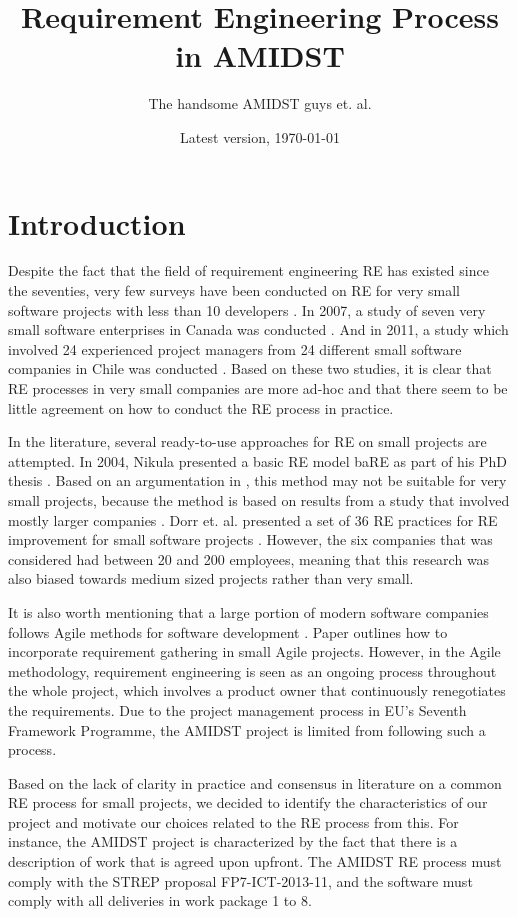 \documentclass[11pt, oneside]{article}   	%
\title{Requirement Engineering Process in AMIDST}
\author{The handsome AMIDST guys et. al.}
\date{Latest version, \today}							%
\begin{document}
\maketitle
%
%
\section{Introduction}

Despite the fact that the field of requirement engineering RE has existed since the seventies, very few surveys have been conducted on RE for very small software projects with less than 10 developers \cite{Qui10}. In 2007, a study of seven very small software enterprises in Canada was conducted \cite{Ara07}.
And in 2011, a study which involved 24 experienced project managers from 24 different small software companies in Chile was conducted \cite{Qui10}.  Based on these two studies, it is clear that RE processes in very small companies are more ad-hoc and that there seem to be little agreement on how to conduct the RE process in practice.

In the literature, several ready-to-use approaches for RE on small projects are attempted.  In 2004, Nikula presented a basic RE model baRE as part of his PhD thesis \cite{Nik04}.  Based on an argumentation in \cite{Qui10}, this method may not be suitable for very small projects, because the method is based on results from a study that involved mostly larger companies \cite{Nik00}.   Dorr et. al. presented a set of 36 RE practices for RE improvement for small software projects \cite{Dor08}.  However, the six companies that was considered had between 20 and 200 employees, meaning that this research was also biased towards medium sized projects rather than very small. 

It is also worth mentioning that a large portion of modern software companies follows Agile methods for software development \cite{Din10}.  Paper \cite{Kav11} outlines how to incorporate requirement gathering in small Agile projects.  However, in the Agile methodology, requirement engineering is seen as an ongoing process throughout the whole project, which involves a product owner that continuously renegotiates the requirements.  Due to the project management process in EU's Seventh Framework Programme, the AMIDST project is limited from following such a process. 

Based on the lack of clarity in practice and consensus in literature on a common RE process for small projects, we decided to identify the characteristics of our project and motivate our choices related to the RE process from this.  For instance, the AMIDST project is characterized by the fact that there is a description of work that is agreed upon upfront.  The 
AMIDST RE process must comply with the STREP proposal FP7-ICT-2013-11, and the software must comply with all deliveries in work package 1 to 8. 
\end{document}
